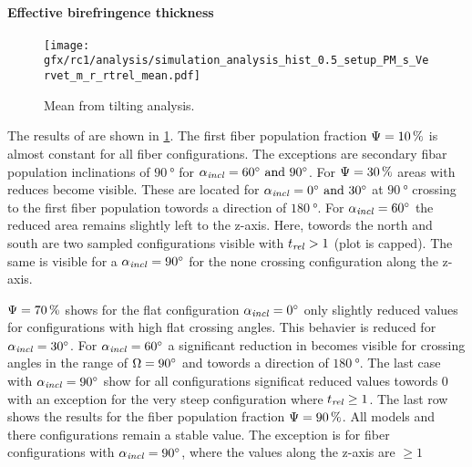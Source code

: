 \paragraph{Effective birefringence thickness \trel{}}
%
\begin{figure}[!p]
    \centering
    \texttt{[image: gfx/rc1/analysis/simulation\_analysis\_hist\_0.5\_setup\_PM\_s\_Vervet\_m\_r\_rtrel\_mean.pdf]}
    \caption{Mean \trel{} from tilting analysis. }
    \label{fig:sim_ana_trel}
\end{figure}
% 
The results of \trel{} are shown in \cref{fig:sim_ana_trel}.
The first fiber population fraction $\textnormal{$\Psi$}=\SI{10}{\percent}$ 
is almost constant for all fiber configurations.
The exceptions are secondary fibar population inclinations of $\SI{90}{\degree}$ for $\modelInc=\SIlist{60;90}{\degree}$.
% 
For $\textnormal{$\Psi$}=\SI{30}{\percent}$ areas with reduces \trel{} become visible.
These are located for $\modelInc=\SIlist{0;30}{\degree}$ at $\SI{90}{\degree}$ crossing to the first fiber population towords a direction of $\SI{180}{\degree}$.
For $\textnormal{$\alpha_{\mathit{incl}}$}=\SI{60}{\degree}$ the reduced \trel{} area remains slightly left to the z-axis.
Here, towords the north and south are two sampled configurations visible with $\textnormal{$t_\mathit{rel}$} > 1$ (plot is capped).
The same is visible for a $\textnormal{$\alpha_{\mathit{incl}}$}=\SI{90}{\degree}$ for the none crossing configuration along the z-axis.
\par
% 
$\textnormal{$\Psi$}=\SI{70}{\percent}$ shows for the flat configuration $\textnormal{$\alpha_{\mathit{incl}}$}=\SI{0}{\degree}$ only slightly reduced \trel{} values for configurations with high flat crossing angles.
This behavier is reduced for $\textnormal{$\alpha_{\mathit{incl}}$}=\SI{30}{\degree}$.
For $\textnormal{$\alpha_{\mathit{incl}}$}=\SI{60}{\degree}$ a significant reduction in \trel{} becomes visible for crossing angles in the range of $\textnormal{$\Omega$}=\SI{90}{\degree}$ and towords a direction of $\SI{180}{\degree}$.
The last case with $\textnormal{$\alpha_{\mathit{incl}}$}=\SI{90}{\degree}$ show for all configurations significat reduced \trel{} values towords $\SI{0}{}$ with an exception for the very steep configuration where $\textnormal{$t_\mathit{rel}$} \geq \SI{1}{}$.
% 
The last row shows the results for the fiber population fraction $\textnormal{$\Psi$}=\SI{90}{\percent}$.
All models and there configurations remain a stable \trel{} value.
The exception is for fiber configurations with $\textnormal{$\alpha_{\mathit{incl}}$}=\SI{90}{\degree}$, where the \trel{} values along the z-axis are $\geq \SI{1}{}$
%
